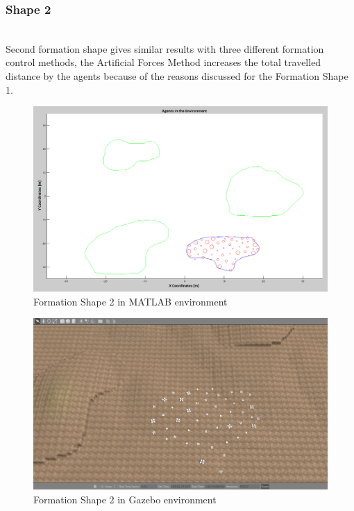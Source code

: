 \subsubsection{Shape 2}\hspace{0pt} \\
Second formation shape gives similar results with three different formation control methods, the Artificial Forces Method increases the total travelled distance by the agents because of the reasons discussed for the Formation Shape 1.

\begin{figure}[H]
\caption{Formation Shape 2 in MATLAB environment}
\centerline{\includegraphics[scale = 0.40]{Trajectories_Formation_Shape_2_2}}
\end{figure} 	
		   
\begin{figure}[H]
\caption{Formation Shape 2 in Gazebo environment}
\centerline{\includegraphics[scale = 0.35]{Trajectories_Formation_Shape_2_1}}
\end{figure} 	
		   
